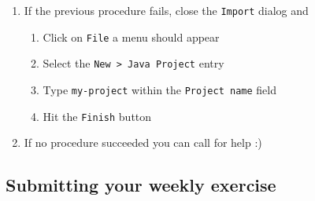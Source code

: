 \documentclass[handout]{beamer}\mode<presentation>{\usetheme{AMSCesenaBleu}}
\begin{document}
\begin{frame}[allowframebreaks]
\begin{enumerate}
        \item If the previous procedure fails, close the \texttt{Import} dialog and
        \begin{enumerate}
            \item Click on \texttt{File} a menu should appear
            \item Select the \texttt{New > Java Project} entry
            \item Type \texttt{\alert{my-project}} within the \texttt{Project name} field
            \item Hit the \texttt{Finish} button
        \end{enumerate}
        
        \item If no procedure succeeded you can call for help :)
        
    \end{enumerate}
\end{frame}

\subsection{Submitting your weekly exercise}
\end{document}
